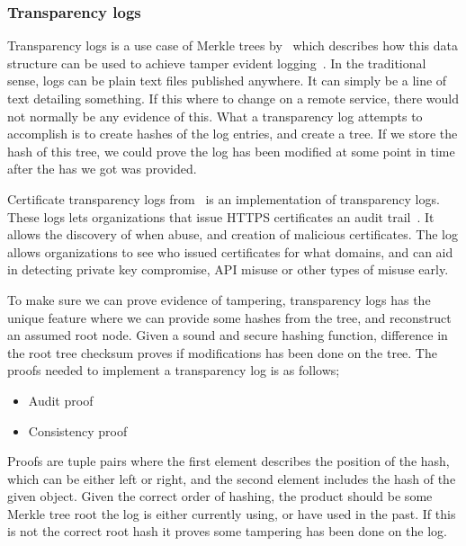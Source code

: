 \documentclass[../Main/thesis.tex]{subfiles}
\begin{document}
\subsubsection*{Transparency logs}%
\label{sub:certificate_transparency_log}
Transparency logs is a use case of Merkle trees by~\citeauthor{182788} which
describes how this data structure can be used to achieve tamper evident
logging~\cite{182788}. In the traditional sense, logs can be plain text files
published anywhere. It can simply be a line of text detailing something. If this
where to change on a remote service, there would not normally be any evidence of
this. What a transparency log attempts to accomplish is to create hashes of the
log entries, and create a tree. If we store the hash of this tree, we could
prove the log has been modified at some point in time after the has we got was
provided. 

Certificate transparency logs
from~\citeauthor{b.-laurie-a.-langley-e.kaster-google-2013} is an implementation
of transparency logs. These logs lets organizations that issue HTTPS
certificates an audit trail~\cite{b.-laurie-a.-langley-e.kaster-google-2013}.
It allows the discovery of when abuse, and creation of malicious certificates.
The log allows organizations to see who issued certificates for what domains,
and can aid in detecting private key compromise, API misuse or other types of
misuse early.

To make sure we can prove evidence of tampering, transparency logs has the
unique feature where we can provide some hashes from the tree, and reconstruct
an assumed root node. Given a sound and secure hashing function, difference in
the root tree checksum proves if modifications has been done on the tree.  The
proofs needed to implement a transparency log is as follows;

\begin{itemize}
\item Audit proof
\item Consistency proof
\end{itemize}

Proofs are tuple pairs where the first element describes the position of the
hash, which can be either left or right, and the second element includes the
hash of the given object. Given the correct order of hashing, the product should
be some Merkle tree root the log is either currently using, or have used in the
past. If this is not the correct root hash it proves some tampering has been
done on the log.
\end{document}
